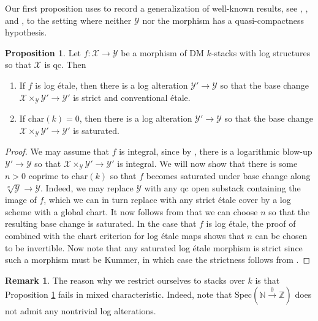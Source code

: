 \documentclass[11pt]{amsart}
\theoremstyle{definition}
\theoremstyle{definition}
\newtheorem{proposition}[theorem]{Proposition}
\newtheorem{remark}[theorem]{Remark}
\newcommand{\cX}{\mathcal{X}}
\newcommand{\cY}{\mathcal{Y}}
\newcommand{\cal}{\mathcal}
\def\cX{{\cal X}}
\def\cY{{\cal Y}}
\begin{document}
Our first proposition uses \cite{m-type-topology} to record a generalization of well-known results, see \cite[Lemma 3.3]{herr2025loggeometryliftingrational}, \cite[Theorem 1.1, Corollary 1.2]{kato2022integral}, and \cite[Theorem 1.01]{molcho2019universal}, to the setting where neither $\mathcal{Y}$ nor the morphism has a quasi-compactness hypothesis.
\begin{proposition}\label{proposition-alteration-to-saturated-morphisms}
Let $f\colon \cX\rightarrow \cY$ be a morphism of DM $k$-stacks with log structures so that $\cX$ is qc. Then
\begin{enumerate}
    \item\label{item: strictify log etale via log alteration} If $f$ is log \'etale, then there is a log alteration $\cY'\rightarrow \cY$ so that the base change $\cX\times_\cY \cY'\rightarrow \cY'$ is strict and conventional \'etale.
    \item If $\text{char}(k)=0$, then there is a log alteration $\cY'\rightarrow \cY$ so that the base change $\cX\times_\cY \cY'\rightarrow \cY'$ is saturated.
\end{enumerate}
\end{proposition}
\begin{proof}
We may assume that $f$ is integral, since by \cite{m-type-topology}, there is a logarithmic blow-up $\cY'\rightarrow\cY$ so that $\cX\times_\cY \cY'\rightarrow\cY'$ is integral. We will now show that there is some $n>0$ coprime to $\text{char}(k)$ so that $f$ becomes saturated under base change along $\sqrt[n]{\cY}\rightarrow\cY$. Indeed, we may replace $\cY$ with any qc open substack containing the image of $f$, which we can in turn replace with any strict \'etale cover by a log scheme with a global chart. It now follows from \cite[Theorem II.3.4]{saturatedTsuji} that we can choose $n$ so that the resulting base change is saturated. In the case that $f$ is log \'etale, the proof of \cite[Theorem II.3.4]{saturatedTsuji} combined with the chart criterion for log \'etale maps shows that $n$ can be chosen to be invertible. Now note that any saturated log \'etale morphism is strict since such a morphism must be Kummer, in which case the strictness follows from \cite[Corollary I.4.3.10, Theorem III.2.5.5]{lecturesonlogarithmicalgebraicgeometry}.
\end{proof}

\begin{remark}\label{remark: something is fucky about mixed char}
    The reason why we restrict ourselves to stacks over $k$ is that Proposition \ref{proposition-alteration-to-saturated-morphisms} fails in mixed characteristic. Indeed, note that $\text{Spec}(\mathbb{N}\xrightarrow{0}\mathbb{Z})$ does not admit any nontrivial log alterations.
\end{remark}
\end{document}
